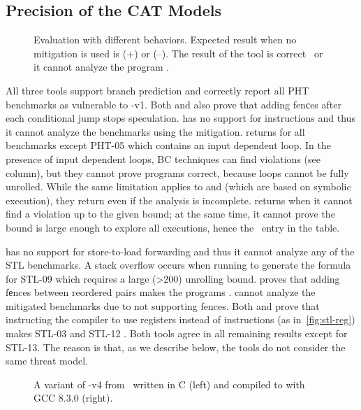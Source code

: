 \documentclass[conference]{IEEEtran}
\begin{document}
\subsection{Precision of the CAT Models}
\label{sec:prec}

\begin{figure}[h]
  
  \caption{Evaluation with different \spectre behaviors. Expected result when no mitigation is used is \safe ({\mygreen +}) or \unsafe ({\red --}). The result of the tool is correct \gtick\ or it cannot analyze the program \danger.}
  \label{table:all}
\end{figure}

All three tools support branch prediction and correctly report all PHT benchmarks as vulnerable to \spectre-v1.
Both \zombmc and \spectector also prove that adding {\selectfont fen{с}es} after each conditional jump stops speculation. 
\binsec has no support for \fence instructions and thus it cannot analyze the benchmarks using the mitigation. 
\zombmc returns \safe for all benchmarks except PHT-05 which contains an input dependent loop.
In the presence of input dependent loops, {BC} techniques can find violations (see \none column), but they cannot prove programs correct, because loops cannot be fully unrolled.
While the same limitation applies to \spectector and \binsec (which are based on symbolic execution), they return \safe even if the analysis is incomplete.
\zombmc returns \unknown when it cannot find a violation up to the given bound; at the same time, it cannot prove the bound is large enough to explore all executions, hence the \danger\ entry in the table.

\spectector has no support for store-to-load forwarding and thus it cannot analyze any of the STL benchmarks.
A stack overflow occurs when running \zombmc to generate the formula for STL-09 which requires a large (\textgreater 200) unrolling bound. %
\zombmc proves that adding {\selectfont f{е}nces} between reordered pairs makes the programs \safe.
\binsec cannot analyze the mitigated benchmarks due to not supporting fences.
Both \zombmc and \binsec prove that instructing the compiler to use registers instead of \store instructions (as in~\autoref{fig:stl-reg}) makes STL-03 and STL-12 \safe.
Both tools agree in all remaining results except for STL-13.
The reason is that, as we describe below, the tools do not consider the same threat model.

\begin{figure*}[]
\centering
  \scalebox{.8}{}
  \caption{A variant of \spectre-v4 from~\cite{spectrev4-litmus} written in C (left) and compiled to \xes with GCC 8.3.0 (right).}
  \label{fig:case13}
\end{figure*}
\end{document}

